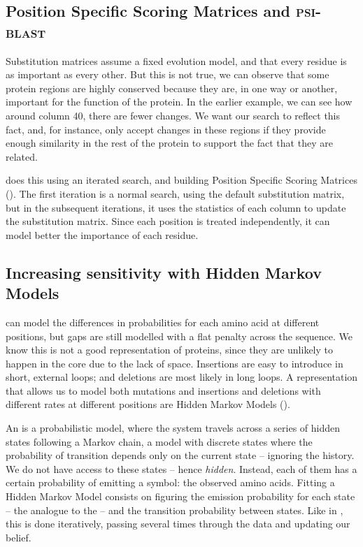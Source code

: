 \subsection[\PSSMs{} and  \PSIBLAST]{Position Specific Scoring Matrices and \textsc{psi-blast}}

Substitution matrices assume a fixed evolution model, and that every residue is as important as every other.
But this is not true, we can observe that some protein regions are highly conserved because they are, in one way or another, important for the function of the protein.
In the earlier example, we can see how around column 40, there are fewer changes.
We want our search to reflect this fact, and, for instance, only accept changes in these regions if they provide enough similarity in the rest of the protein to support the fact that they are related.

\PSIBLAST{} \citep{psiblast} does this using an iterated search, and building Position Specific Scoring Matrices (\PSSM).
The first iteration is a normal \BLAST{} search, using the default substitution matrix, but in the subsequent iterations, it uses the statistics of each column to update the substitution matrix.
Since each position is treated independently, it can model better the importance of each residue.

\subsection[Hidden Markov Models]{Increasing sensitivity with Hidden Markov Models}
\PSSMs{} can model the differences in probabilities for each amino acid at different positions, but gaps are still modelled with a flat penalty across the sequence.
We know this is not a good representation of proteins, since they are unlikely to happen in the core due to the lack of space.
Insertions are easy to introduce in short, external loops; and deletions are most likely in long loops. 
A representation that allows us to model both mutations and insertions and deletions with different rates at different positions are Hidden Markov Models (\HMM).

An \HMM{}  is a probabilistic model, where the system travels across a series of hidden states following a Markov chain, a model with discrete states where the probability of transition depends only on the current state -- ignoring the history.
We do not have access to these states -- hence \emph{hidden}.
Instead, each of them has a certain probability of emitting a symbol: the observed amino acids.
Fitting a Hidden Markov Model consists on figuring the emission probability for each state -- the analogue to the \PSSMs{} -- and the transition probability between states.
Like in \PSIBLAST, this is done iteratively, passing several times through the data and updating our belief.


